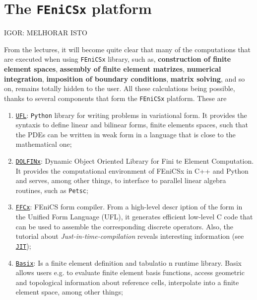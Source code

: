 \section{The \texttt{FEniCSx} platform}

IGOR: MELHORAR ISTO

From the lectures, it will become quite clear that many of the computations
that are executed when using \texttt{FEniCSx} library, such as,
\textbf{construction of finite element spaces}, \textbf{assembly of finite element
	matrizes}, \textbf{numerical integration}, \textbf{imposition of boundary conditions},
\textbf{matrix solving}, and so on, 
remains totally hidden to the user. All these calculations being possible,
thanks to several components that form the \texttt{FEniCSx} platform. 
These are

\begin{enumerate}
	
	\item \href{https://github.com/FEniCS/dolfinx}{\texttt{UFL}}: \texttt{Python} library for writing problems
	in variational form. It
	provides the syntaxis to define linear and bilinear forms, finite elements spaces, such that the PDEs can 
	be written in weak form
	in a language that is close to the mathematical one;\\
	
	\item \href{https://github.com/FEniCS/dolfinx}{\texttt{DOLFINx}}: Dynamic Object Oriented Library for Fini
	te Element Computation.
	It provides the computational environment of FEniCSx in C++ and Python and serves, among other things,
	to interface to parallel linear algebra routines, such as \texttt{Petsc}; \\ 
	
	\item \href{https://github.com/FEniCS/ffcx}{\texttt{FFCx}}: FEniCS form compiler.  From a high-level descr
	iption of the form in the Unified Form Language (UFL), it generates efficient low-level C code that can be
	used to assemble the corresponding discrete operators. Also, the tutorial about \emph{Just-in-time-compilation} reveals interesting information (see \href{https://jorgensd.github.io/dolfinx-tutorial/chapter4/com
		piler_parameters.html}{\texttt{JIT}}); \\
	
	\item \href{https://github.com/FEniCS/basix}{\texttt{Basix}}: Is a finite element definition and tabulatio
	n runtime library.
	Basix allows users e.g. to evaluate finite element basis functions, access geometric and topological information about reference cells,
	interpolate into a finite element space, among other things;
	
\end{enumerate}

